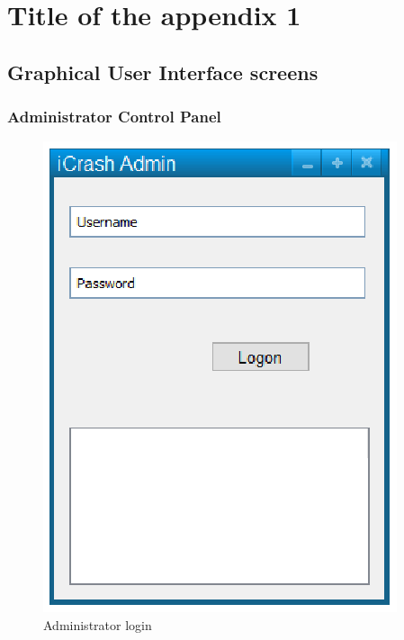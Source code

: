 \chapter{Title of the appendix 1}
\label{chap:appendix1}

\section{Graphical User Interface screens}

\subsection{Administrator Control Panel}

\begin{figure}
  \centering
    \includegraphics{images/mockups/feature1-login/AdminLogon.eps}
  \caption{Administrator login}
  \label{fig:AdminLogin}
\end{figure}


